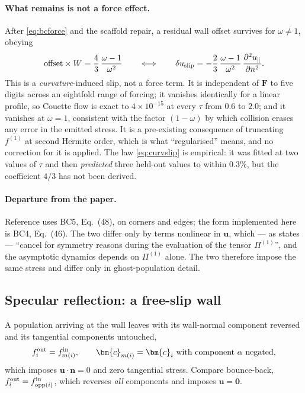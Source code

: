 \documentclass[11pt,a4paper]{article}
\newcommand{\uu}{\bm{u}}
\newcommand{\nn}{\bm{n}}
\newcommand{\e}[1]{\times 10^{#1}}
\begin{document}
\paragraph{What remains is not a force effect.} After \eqref{eq:bcforce} and the
scaffold repair, a residual wall offset survives for $\omega\neq1$, obeying
\begin{equation}
  \text{offset}\times W = \frac{4}{3}\,\frac{\omega-1}{\omega^{2}}
  \qquad\Longleftrightarrow\qquad
  \delta u_{\rm slip} = -\frac{2}{3}\,\frac{\omega-1}{\omega^{2}}
                        \,\frac{\partial^2 u_\parallel}{\partial n^2}.
  \label{eq:curvslip}
\end{equation}
This is a \emph{curvature}-induced slip, not a force term. It is independent of
$\bm F$ to five digits across an eightfold range of forcing; it vanishes
identically for a linear profile, so Couette flow is exact to $4\e{-15}$ at
every $\tau$ from $0.6$ to $2.0$; and it vanishes at $\omega=1$, consistent with
the factor $(1-\omega)$ by which collision erases any error in the emitted
stress. It is a pre-existing consequence of truncating $f^{(1)}$ at second
Hermite order, which is what ``regularised'' means, and no correction for it is
applied. The law \eqref{eq:curvslip} is empirical: it was fitted at two values
of $\tau$ and then \emph{predicted} three held-out values to within $0.3\%$, but
the coefficient $4/3$ has not been derived.

\paragraph{Departure from the paper.} Reference \cite{latt2008} uses BC5,
Eq.~(48), on corners and edges; the form implemented here is BC4, Eq.~(46).
The two differ only by terms nonlinear in $\uu$, which --- as \cite{latt2008}
states --- ``cancel for symmetry reasons during the evaluation of the tensor
$\Pi^{(1)}$'', and the asymptotic dynamics depends on $\Pi^{(1)}$ alone. The two
therefore impose the same stress and differ only in ghost-population detail.

\subsection{Specular reflection: a free-slip wall}
\label{sec:specular}

A population arriving at the wall leaves with its wall-normal component reversed
and its tangential components untouched,
\begin{equation}
  f_i^{\rm out} = f_{m(i)}^{\rm in},\qquad
  \bm{c}_{m(i)} = \bm{c}_i \text{ with component } \alpha \text{ negated},
  \label{eq:specular}
\end{equation}
which imposes $\uu\!\cdot\!\nn=0$ and zero tangential stress. Compare bounce-back,
$f_i^{\rm out}=f_{{\rm opp}(i)}^{\rm in}$, which reverses \emph{all} components
and imposes $\uu=\bm{0}$.
\end{document}
